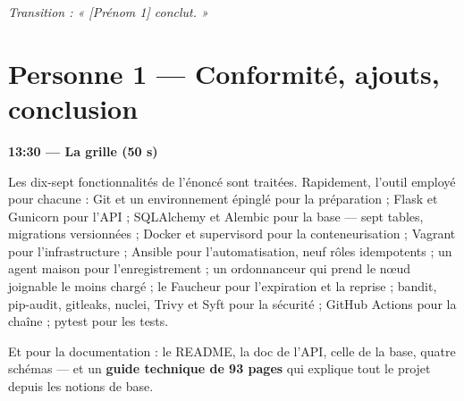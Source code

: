 \documentclass[a4paper,11pt,oneside]{report}
\newcommand{\minute}[1]{%
  \vspace{4pt}\noindent{\color{insared}\rule{3pt}{14pt}}\hspace{6pt}%
  {\large\bfseries #1}\par\vspace{3pt}}
\newcommand{\fonc}[1]{%
  \par\vspace{3pt}\noindent{\small\color{insared}$\rightarrow$\ \textbf{#1}}\par}
\begin{document}
\fonc{Fonctionnalité 15 (CI/CD)}

\begin{center}\small\itshape
Transition : « \textit{[Prénom 1]} conclut. »
\end{center}

\chapter{Personne 1 — Conformité, ajouts, conclusion}

\minute{13:30 — La grille (50 s)}

\begin{adire}
Les dix-sept fonctionnalités de l'énoncé sont traitées. Rapidement, l'outil
employé pour chacune : Git et un environnement épinglé pour la préparation ;
Flask et Gunicorn pour l'API ; SQLAlchemy et Alembic pour la base --- sept
tables, migrations versionnées ; Docker et supervisord pour la
conteneurisation ; Vagrant pour l'infrastructure ; Ansible pour
l'automatisation, neuf rôles idempotents ; un agent maison pour
l'enregistrement ; un ordonnanceur qui prend le nœud joignable le moins chargé ;
le Faucheur pour l'expiration et la reprise ; bandit, pip-audit, gitleaks,
nuclei, Trivy et Syft pour la sécurité ; GitHub Actions pour la chaîne ; pytest
pour les tests.

\medskip
Et pour la documentation : le README, la doc de l'API, celle de la base, quatre
schémas --- et un \textbf{guide technique de 93 pages} qui explique tout le
projet depuis les notions de base.
\end{adire}
\end{document}
